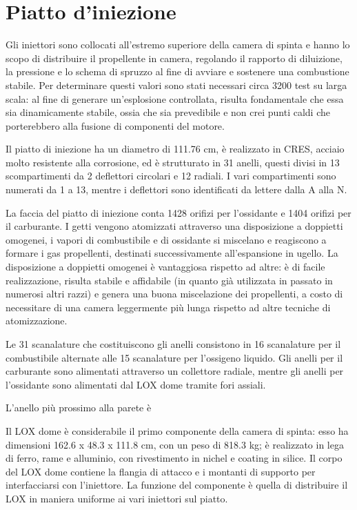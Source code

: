 \section{Piatto d'iniezione}
\label{sec:piatto iniezione}


Gli iniettori sono collocati all’estremo superiore della camera di spinta e hanno lo scopo di distribuire il propellente in camera, regolando il rapporto di diluizione, la pressione e lo schema di spruzzo al fine di avviare e sostenere una combustione stabile. Per determinare questi valori sono stati necessari circa 3200 test su larga scala: al fine di generare un’esplosione controllata, risulta fondamentale che essa sia dinamicamente stabile, ossia che sia prevedibile e non crei punti caldi che porterebbero alla fusione di componenti del motore.

Il piatto di iniezione ha un diametro di 111.76 cm, è realizzato in CRES, acciaio molto resistente alla corrosione, ed è strutturato in 31 anelli, questi divisi in 13 scompartimenti da 2 deflettori circolari e 12 radiali. I vari compartimenti sono numerati da 1 a 13, mentre i deflettori sono identificati da lettere dalla A alla N.

La faccia del piatto di iniezione conta 1428 orifizi per l’ossidante e 1404 orifizi per il carburante. I getti vengono atomizzati attraverso una disposizione a doppietti omogenei, i vapori di combustibile e di ossidante si miscelano e reagiscono a formare i gas propellenti, destinati successivamente all’espansione in ugello. La disposizione a doppietti omogenei è vantaggiosa rispetto ad altre: è di facile realizzazione, risulta stabile e affidabile (in quanto già utilizzata in passato in numerosi altri razzi) e genera una buona miscelazione dei propellenti, a costo di necessitare di una camera leggermente più lunga rispetto ad altre tecniche di atomizzazione.

Le 31 scanalature che costituiscono gli anelli consistono in 16 scanalature per il combustibile alternate alle 15 scanalature per l’ossigeno liquido. Gli anelli per il carburante sono alimentati attraverso un collettore radiale, mentre gli anelli per l’ossidante sono alimentati dal LOX dome tramite fori assiali.

L'anello più prossimo alla parete è 

Il LOX dome è considerabile il primo componente della camera di spinta: esso ha dimensioni 162.6 x 48.3 x 111.8 cm, con un peso di 818.3 kg; è realizzato in lega di ferro, rame e alluminio, con rivestimento in nichel e coating in silice. Il corpo del LOX dome contiene la flangia di attacco e i montanti di supporto per interfacciarsi con l’iniettore. La funzione del componente è quella di distribuire il LOX in maniera uniforme ai vari iniettori sul piatto.

